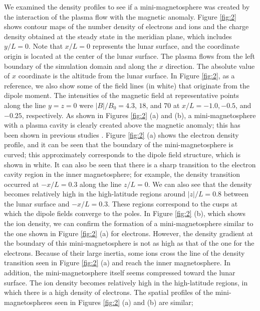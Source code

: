 \documentclass[draft,jgrga]{agutex2015}
\begin{document}
\begin{article}
We examined the density profiles to see 
if a mini-magnetosphere was created by the interaction of
the plasma flow with the magnetic anomaly.
Figure \ref{fig:2} shows contour maps of the number density of electrons and ions  
and the charge density obtained at the steady state 
in the meridian plane, which includes $y/L = 0$. 
Note that $x/L=0$ represents the lunar surface, and 
the coordinate origin is located at the center of the lunar surface.
The plasma flows from the left boundary of 
the simulation domain and along the $x$ direction. 
The absolute value of $x$ coordinate is the altitude from the lunar surface.
In Figure \ref{fig:2}, as a reference,
we also show some of the field lines (in white) that originate from the dipole moment.
The intensities of the magnetic field at representative points along the line $y=z=0$
were $|B|/B_{\mathrm{0}} = 4.3$, $18$, and $70$ at $x/L=-1.0, -0.5$, and $-0.25$, respectively.
As shown in Figures \ref{fig:2} (a) and (b), 
a mini-magnetosphere with a plasma cavity is clearly 
created above the magnetic anomaly; this has been shown in 
previous studies
\citep[e.g.,][]{Harnett2000,Harnett2003,Halekas2008b,Bamford2012}.
Figure \ref{fig:2} (a) shows the electron density profile, and it can be seen that the boundary of the mini-magnetosphere is curved; this approximately corresponds to the dipole field structure, which is
shown in white.
It can also be seen that there is a sharp transition to 
the electron cavity region in the inner magnetosphere; for example,
the density transition occurred at $-x/L = 0.3$ 
along the line $z/L =0$.
We can also see that the density becomes relatively high 
in the high-latitude regions around
$|z|/L=0.8$ between the lunar surface and $-x/L=0.3$.
These regions correspond to the cusps at which the dipole fields converge to the poles.
In Figure \ref{fig:2} (b), which shows the ion density, 
we can confirm the formation of a mini-magnetosphere similar to the one shown 
in Figure \ref{fig:2} (a) for electrons.
However, 
the density gradient at the boundary of this mini-magnetosphere is 
not as high as that of the one for the electrons.
Because of their large inertia, some ions cross the line of the density transition seen in Figure \ref{fig:2} (a) and 
reach the inner magnetosphere. 
In addition, the mini-magnetosphere itself seems compressed toward the lunar surface.
The ion density becomes relatively high in the high-latitude regions, in which there is a 
high density of electrons. 
The spatial profiles of the mini-magnetospheres seen in Figures \ref{fig:2} (a) and (b) are similar;

\end{article}
\end{document}
